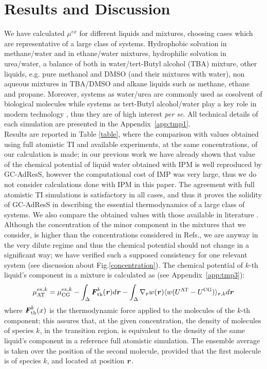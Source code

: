 \documentclass[a4paper,preprint,unsortedaddress]{revtex4-1}
\newcommand{\vect}[1]{\textbf{\textit{#1}}}
\newcommand{\AT}{{\textrm{{AT}}}}
\newcommand{\CG}{{\textrm{CG}}}
\newcommand{\thf}{{\textrm{th}}}
\newcommand{\exc}{{\textrm{ex}}}
\begin{document}
\section{Results and Discussion}
We have calculated $\mu^{ex}$ for different liquids and mixtures, choosing cases which are representative of a large class of systems. Hydrophobic solvation in methane/water and in ethane/water mixtures, hydrophilic solvation in urea/water, a balance of both in water/tert-Butyl alcohol (TBA) mixture, other liquids, e.g. pure methanol and DMSO (and their mixtures with water), non aqueous mixtures in TBA/DMSO and alkane liquids such as methane, ethane and propane. Moreover, systems as water/urea are commonly used as cosolvent of biological molecules \cite{nico-debashish} while systems as tert-Butyl alcohol/water play a key role in modern technology \cite{irata}, thus they are of high interest {\it per se}. All technical details of each simulation are presented in the Appendix~\ref{app:tmp1}.\\

Results are reported in Table \ref{table}, where the comparison with values obtained using full atomistic TI and available experiments, at the same concentrations, of our calculation is made; in our previous work we have already shown that value of the chemical potential of liquid water obtained with IPM is well reproduced by GC-AdResS, however the computational cost of IMP was very large, thus we do not consider calculations done with IPM in this paper. 
The agreement with full atomistic TI simulations is satisfactory in all cases, and thus it proves the solidity of GC-AdResS in describing the essential thermodynamics of a large class of systems.
We also compare the obtained values with those available in literature \cite{vang,nico}. Although the concentration of the minor component in the mixtures that we consider, is higher than the concentrations considered in Refs.\cite{vang,nico}, we are anyway in the very dilute regime and thus the chemical potential should not change in a significant way; {we have verified  such a supposed consistency for one relevant system (see discussion about Fig.\ref{concentration})}. 
The chemical potential of $k$-th liquid's component in a mixture is calculated as {(see Appendix~\ref{app:tmp3})}:
\begin{equation}
  \mu^{\exc,k}_{\AT}=
  \mu^{\exc,k}_{\CG}-
  \int_{\Delta}{\vect F}^k_{\thf}({\vect r})d{\vect r}-
  \int_{\Delta}\nabla_{\vect r} w(\vect r) \langle w(U^{\AT}-U^{\CG})\rangle_{\vect r, k} d{\vect r}
\label{eqn:tmp25}
\end{equation}
where $\vect{F}^{k}_{\thf}(x)$ is the thermodynamic force applied to the molecules of the $k$-th component; this assures that, at the given concentration, the density of molecules of species $k$, in the transition region, is equivalent to the density of the same liquid's component in a reference full atomistic simulation.
{The ensemble average is taken over the position of the second molecule, provided that the first molecule is of species $k$, and located at position $\vect r$}.\\
\end{document}
